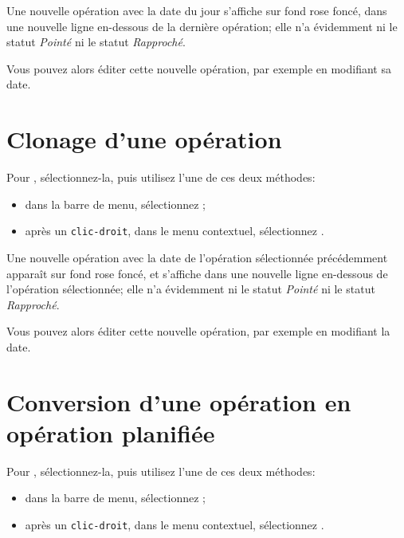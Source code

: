 Une nouvelle opération avec la date du jour s'affiche sur \colorbox[RGB]{245,155,155}{fond rose foncé}, dans une nouvelle ligne en-dessous de la dernière opération; elle n'a évidemment ni le statut \emph{Pointé} ni le statut \emph{Rapproché}.

Vous pouvez alors éditer cette nouvelle opération, par exemple en modifiant sa date.


\section{Clonage d'une opération\label{transactions-duplicate}}

Pour , sélectionnez-la, puis utilisez l'une de ces deux méthodes:
\begin{itemize}
	\item dans la barre de menu, sélectionnez ;
	\item après un \texttt{clic-droit}, dans le menu contextuel, sélectionnez .
\end{itemize}

Une nouvelle opération avec la date de l'opération sélectionnée précédemment apparaît sur \colorbox[RGB]{245,155,155}{fond rose foncé}, et s'affiche dans une nouvelle ligne en-dessous de l'opération sélectionnée; elle n'a évidemment ni le statut \emph{Pointé} ni le statut \emph{Rapproché}.

Vous pouvez alors éditer cette nouvelle opération, par exemple en modifiant la date.


\section{Conversion d'une opération en opération planifiée\label{transactions-schedule}}

Pour , sélectionnez-la, puis utilisez l'une de ces deux méthodes:
\begin{itemize}
	\item dans la barre de menu, sélectionnez ;
	\item après un \texttt{clic-droit}, dans le menu contextuel, sélectionnez .
\end{itemize}

